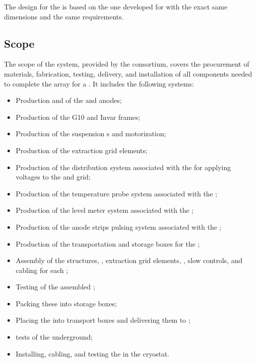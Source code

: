 The  design for the  is based on the one developed for  with the exact same dimensions and 
the same requirements.
\subsection{Scope}
\label{ch:dp-crp-scope}

The scope of the  system, provided by the  consortium, covers the procurement of materials, fabrication, testing, delivery, and installation of all components needed to complete the  array for a  . It includes the following systems: 
\begin{itemize}
\item  Production and  of the  and anodes;
\item  Production of the G10 and Invar frames;
\item Production of the suspension \fdth{}s and motorization;
\item Production of the extraction grid elements;
\item Production of the  distribution system associated with the  for applying voltages to the  and grid;
\item Production of the temperature probe system associated with the ;
\item Production of the level meter system associated with the ;
\item Production of the anode strips pulsing system  
associated with the ;
\item Production of the transportation and storage boxes for the ;
\item Assembly of the  structures, , extraction grid elements, , slow controls, and cabling for each ;
\item Testing of the assembled ;
\item Packing these  into storage boxes;
\item Placing the  into transport boxes and delivering them to ; 
\item \coldbox tests of the  underground;
\item Installing, cabling, and testing the  in the cryostat.
\end{itemize}

